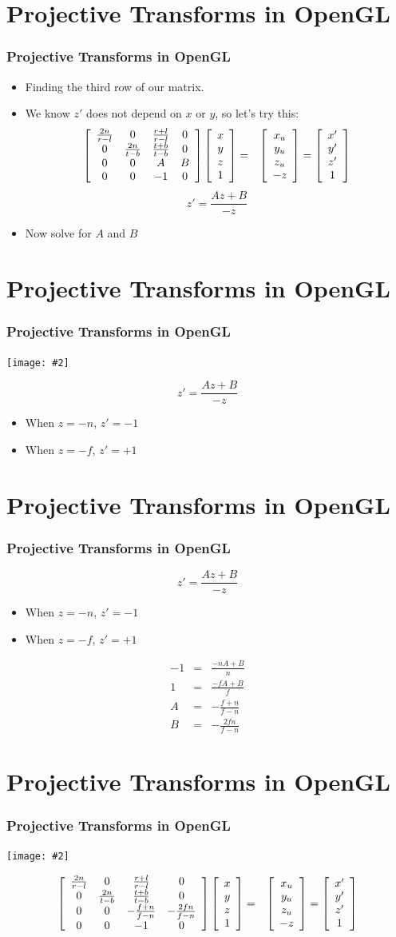 \documentclass[slidestop,xcolor=pst]{beamer}
\newcommand{\graphc}[2]{\centerline{\texttt{[image: \#2]}}}
\newcommand{\sect}[1]{
\section{#1}
\begin{frame}[fragile]\frametitle{#1}
}
\begin{document}
\sect{Projective Transforms in OpenGL}
\begin{itemize}
\item Finding the third row of our matrix.
\item We know $z'$ does not depend on $x$ or $y$, so let's try this:
\begin{eqnarray*}
\left[\begin{array}{cccc} \frac{2n}{r-l}& 0 & \frac{r+l}{r-l}& 0 \\ 0 & \frac{2n}{t-b}&\frac{t+b}{t-b}& 0 \\ 0&0&A&B \\ 0&0&-1&0\end{array}\right]
\left[\begin{array}{c} x\\y\\z \\ 1\end{array}\right]
&=&\left[\begin{array}{c} x_u\\y_u\\z_u\\-z \end{array}\right]
=\left[\begin{array}{c} x'\\y'\\z' \\ 1\end{array}\right]
  \end{eqnarray*}
\[
z' =\frac{Az + B}{-z}
\]
\item Now solve for $A$ and $B$
\end{itemize}
\end{frame}

\sect{Projective Transforms in OpenGL}
\graphc{.8}{gl_projectionmatrix01.png}
\[
z' =\frac{Az + B}{-z}
\]
\pause
\begin{itemize}
\item When $z = -n$, $z' = -1$
\item When $z = -f$, $z' = +1$
\end{itemize}
\end{frame}

\sect{Projective Transforms in OpenGL}
\[
z' =\frac{Az + B}{-z}
\]
\begin{itemize}
\item When $z = -n$, $z' = -1$
\item When $z = -f$, $z' = +1$
\end{itemize}
\begin{eqnarray*}
-1 &=& \frac{-nA+B}{n}\\
1 &=& \frac{-fA+B}{f}\\
A &=& -\frac{f+n}{f-n}\\
B &=& -\frac{2fn}{f-n}
\end{eqnarray*}
\end{frame}

\sect{Projective Transforms in OpenGL}
\graphc{.8}{gl_projectionmatrix01.png}
\begin{eqnarray*}
\left[\begin{array}{cccc} \frac{2n}{r-l}& 0 & \frac{r+l}{r-l}& 0 \\ 0 & \frac{2n}{t-b}&\frac{t+b}{t-b}& 0 \\ 0&0& -\frac{f+n}{f-n}& -\frac{2fn}{f-n} \\ 0&0&-1&0\end{array}\right]
\left[\begin{array}{c} x\\y\\z \\ 1\end{array}\right]
&=&\left[\begin{array}{c} x_u\\y_u\\z_u\\-z \end{array}\right]
=\left[\begin{array}{c} x'\\y'\\z' \\ 1\end{array}\right]
  \end{eqnarray*}
\end{frame}
\end{document}
